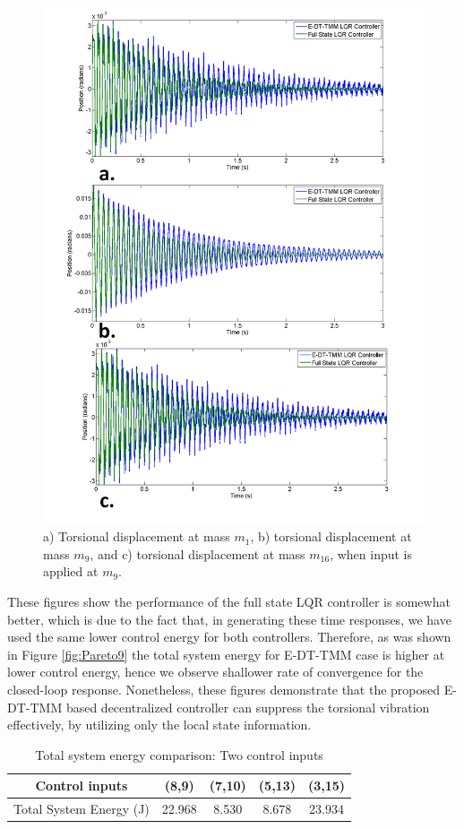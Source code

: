 \documentclass[11pt]{ucthesis}
\begin{document}
\begin{figure}[thpb]
\centering
\includegraphics[width=.65\linewidth]{Figures/Position.png}
\caption{a) Torsional displacement at mass $m_1$, b) torsional displacement at mass $m_9$, and c) torsional displacement at mass $m_{16}$, when input is applied at $m_9$.}
\label{time_m_1}
\end{figure}

These figures show the performance of the full state LQR controller is somewhat better, which is due to the fact that, in generating these time responses, we have used the same lower control energy for both controllers. Therefore, as was shown in Figure \ref{fig:Pareto9} the total system energy for E-DT-TMM case is higher at lower control energy, hence we observe shallower rate of convergence for the closed-loop response. Nonetheless, these figures demonstrate that the proposed E-DT-TMM based decentralized controller can suppress the torsional vibration effectively, by utilizing only the local state information.

\begin{table}
\begin{center}
\caption{Total system energy comparison: Two control inputs}
\label{t:twoinputs}
\begin{tabular}{|c||c|c|c|c|}
\hline
Control inputs & (8,9) & (7,10) & (5,13) & (3,15) \\
\hline
Total System Energy (J) & 22.968 & 8.530 & 8.678 & 23.934 \\ 
\hline
\end{tabular}
\end{center}
\end{table}
\end{document}
